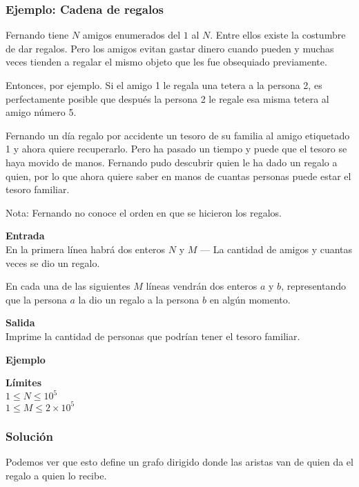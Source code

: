 \subsubsection*{Ejemplo: Cadena de regalos}
Fernando tiene \(N\) amigos enumerados del \(1\) al \(N\). Entre ellos existe la costumbre de dar regalos. Pero los amigos evitan gastar dinero cuando pueden y muchas veces tienden a regalar el mismo objeto que les fue obsequiado previamente.

Entonces, por ejemplo. Si el amigo 1 le regala una tetera a la persona 2, es perfectamente posible que después la persona 2 le regale esa misma tetera al amigo número 5. 

Fernando un día regalo por accidente un tesoro de su familia al amigo etiquetado 1 y ahora quiere recuperarlo. Pero ha pasado un tiempo y puede que el tesoro se haya movido de manos. Fernando pudo descubrir quien le ha dado un regalo a quien, por lo que ahora quiere saber en manos de cuantas personas puede estar el tesoro familiar.

Nota: Fernando no conoce el orden en que se hicieron los regalos.

\textbf{Entrada}\\
En la primera línea habrá dos enteros \(N\) y \(M\) --- La cantidad de amigos y cuantas veces se dio un regalo.

En cada una de las siguientes \(M\) líneas vendrán dos enteros \(a\) y \(b\), representando que la persona \(a\) la dio un regalo a la persona \(b\) en algún momento.

\textbf{Salida}\\
Imprime la cantidad de personas que podrían tener el tesoro familiar.

\textbf{Ejemplo}\\
\begin{casebox3}
\end{casebox3}

\textbf{Límites}\\
\(1\leq N \leq 10^5\)\\
\(1 \leq M \leq 2\times 10^5\)

\subsubsection*{Solución}
Podemos ver que esto define un grafo dirigido donde las aristas van de quien da el regalo a quien lo recibe.

